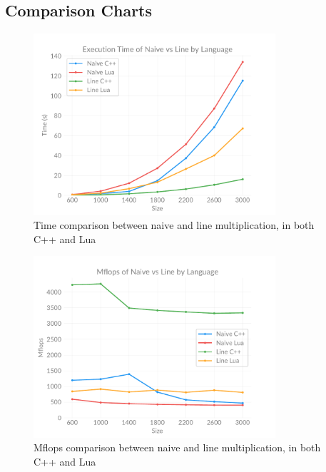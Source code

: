 \subsection{Comparison Charts} \label{section:appendix:charts}

    \begin{figure}[h]
        \centering
        \captionsetup{justification=centering, margin=2cm}
        \includegraphics[width=0.8\textwidth]{pdf/naive-line-time}
        \caption{Time comparison between naive and line multiplication, in both C++ and Lua}
        \label{fig:chart:naive-line-time}
    \end{figure}

    \begin{figure}[h]
        \centering
        \captionsetup{justification=centering, margin=2cm}
        \includegraphics[width=0.8\textwidth]{pdf/naive-line-flops}
        \caption{Mflops comparison between naive and line multiplication, in both C++ and Lua}
        \label{fig:chart:naive-line-flops}
    \end{figure}

